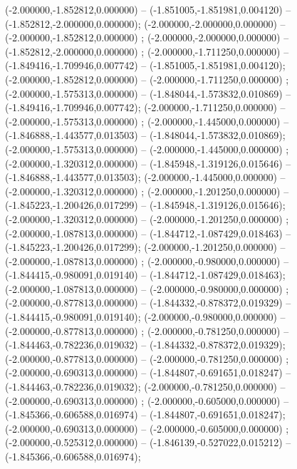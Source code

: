 (-2.000000,-1.852812,0.000000) -- (-1.851005,-1.851981,0.004120) -- (-1.852812,-2.000000,0.000000);
 (-2.000000,-2.000000,0.000000) -- (-2.000000,-1.852812,0.000000) ;
 (-2.000000,-2.000000,0.000000) -- (-1.852812,-2.000000,0.000000) ;
 (-2.000000,-1.711250,0.000000) -- (-1.849416,-1.709946,0.007742) -- (-1.851005,-1.851981,0.004120);
 (-2.000000,-1.852812,0.000000) -- (-2.000000,-1.711250,0.000000) ;
 (-2.000000,-1.575313,0.000000) -- (-1.848044,-1.573832,0.010869) -- (-1.849416,-1.709946,0.007742);
 (-2.000000,-1.711250,0.000000) -- (-2.000000,-1.575313,0.000000) ;
 (-2.000000,-1.445000,0.000000) -- (-1.846888,-1.443577,0.013503) -- (-1.848044,-1.573832,0.010869);
 (-2.000000,-1.575313,0.000000) -- (-2.000000,-1.445000,0.000000) ;
 (-2.000000,-1.320312,0.000000) -- (-1.845948,-1.319126,0.015646) -- (-1.846888,-1.443577,0.013503);
 (-2.000000,-1.445000,0.000000) -- (-2.000000,-1.320312,0.000000) ;
 (-2.000000,-1.201250,0.000000) -- (-1.845223,-1.200426,0.017299) -- (-1.845948,-1.319126,0.015646);
 (-2.000000,-1.320312,0.000000) -- (-2.000000,-1.201250,0.000000) ;
 (-2.000000,-1.087813,0.000000) -- (-1.844712,-1.087429,0.018463) -- (-1.845223,-1.200426,0.017299);
 (-2.000000,-1.201250,0.000000) -- (-2.000000,-1.087813,0.000000) ;
 (-2.000000,-0.980000,0.000000) -- (-1.844415,-0.980091,0.019140) -- (-1.844712,-1.087429,0.018463);
 (-2.000000,-1.087813,0.000000) -- (-2.000000,-0.980000,0.000000) ;
 (-2.000000,-0.877813,0.000000) -- (-1.844332,-0.878372,0.019329) -- (-1.844415,-0.980091,0.019140);
 (-2.000000,-0.980000,0.000000) -- (-2.000000,-0.877813,0.000000) ;
 (-2.000000,-0.781250,0.000000) -- (-1.844463,-0.782236,0.019032) -- (-1.844332,-0.878372,0.019329);
 (-2.000000,-0.877813,0.000000) -- (-2.000000,-0.781250,0.000000) ;
 (-2.000000,-0.690313,0.000000) -- (-1.844807,-0.691651,0.018247) -- (-1.844463,-0.782236,0.019032);
 (-2.000000,-0.781250,0.000000) -- (-2.000000,-0.690313,0.000000) ;
 (-2.000000,-0.605000,0.000000) -- (-1.845366,-0.606588,0.016974) -- (-1.844807,-0.691651,0.018247);
 (-2.000000,-0.690313,0.000000) -- (-2.000000,-0.605000,0.000000) ;
 (-2.000000,-0.525312,0.000000) -- (-1.846139,-0.527022,0.015212) -- (-1.845366,-0.606588,0.016974);

